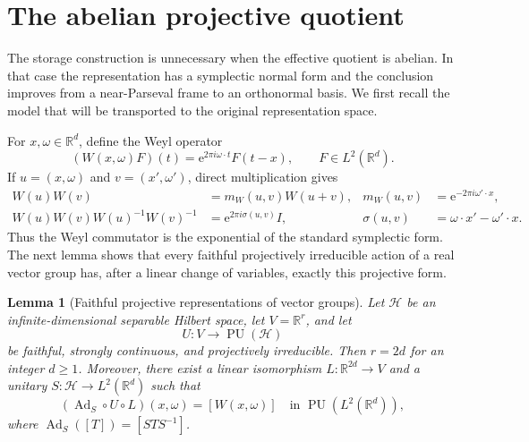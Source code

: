 \documentclass[10pt,a4paper]{amsart}
\numberwithin{equation}{section}
\newtheorem{lemma}[theorem]{Lemma}
\newcommand{\cH}{\mathcal H}
\newcommand{\R}{\mathbb R}
\newcommand{\PU}{\operatorname{PU}}
\newcommand{\e}{\mathrm e}
\begin{document}
\section{The abelian projective quotient}\label{sec:abelian}

The storage construction is unnecessary when the effective quotient is
abelian.  In that case the representation has a symplectic normal form and
the conclusion improves from a near-Parseval frame to an orthonormal basis.
We first recall the model that will be transported to the original
representation space.

For $x,\omega\in\R^d$, define the Weyl operator
\begin{equation}\label{eq:Weyl-operator}
 (W(x,\omega)F)(t)=\e^{2\pi i\omega\cdot t}F(t-x),
 \qquad F\in L^2(\R^d).
\end{equation}
If $u=(x,\omega)$ and $v=(x',\omega')$, direct multiplication gives
\begin{align}
 W(u)W(v)
 &=m_W(u,v)W(u+v),
 &m_W(u,v)&=\e^{-2\pi i\omega'\cdot x},
                                                        \label{eq:Weyl-multiplier}\\
 W(u)W(v)W(u)^{-1}W(v)^{-1}
 &=\e^{2\pi i\sigma(u,v)}I,
 &\sigma(u,v)&=\omega\cdot x'-\omega'\cdot x.
                                                        \label{eq:Weyl-commutator}
\end{align}
Thus the Weyl commutator is the exponential of the standard symplectic form.
The next lemma shows that every faithful projectively irreducible action of a
real vector group has, after a linear change of variables, exactly this
projective form.

\begin{lemma}[Faithful projective representations of vector groups%
]
\label{lem:projective-vector-group}
Let $\cH$ be an infinite-dimensional separable Hilbert space, let
$V=\R^r$, and let
\[
 U:V\longrightarrow\PU(\cH)
\]
be faithful, strongly continuous, and projectively irreducible.  Then
$r=2d$ for an integer $d\geq1$.  Moreover, there exist a linear isomorphism
$L:\R^{2d}\to V$ and a unitary $S:\cH\to L^2(\R^d)$ such that
\begin{equation}\label{eq:projective-Weyl-equivalence}
 (\operatorname{Ad}_S\circ U\circ L)(x,\omega)
 =[W(x,\omega)]
 \quad\text{in }\PU(L^2(\R^d)),
\end{equation}
where $\operatorname{Ad}_S([T])=[STS^{-1}]$.
\end{lemma}
\end{document}
